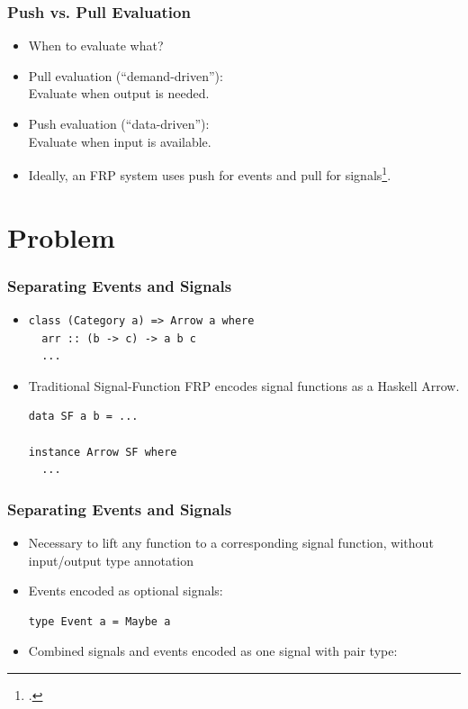 \documentclass{beamer}
\begin{document}
\begin{frame}
\frametitle{Push vs. Pull Evaluation}
    \begin{itemize}
        \item When to evaluate what?
        \item Pull evaluation (``demand-driven''):\\ Evaluate when output is needed.
        \item Push evaluation (``data-driven''):\\ Evaluate when input is available.
        \item Ideally, an FRP system uses push for events and pull for signals\footcite{Elliott2009}.
    \end{itemize}
\end{frame}

\section{Problem}

\begin{frame}[fragile]
\frametitle{Separating Events and Signals}
    \begin{itemize}
        \item[] 
\begin{Verbatim}
class (Category a) => Arrow a where
  arr :: (b -> c) -> a b c
  ...
\end{Verbatim}
        \item Traditional Signal-Function FRP encodes signal functions as a Haskell Arrow.
\begin{Verbatim}
data SF a b = ...

instance Arrow SF where
  ...
\end{Verbatim}
    \end{itemize}
\end{frame}

\begin{frame}[fragile]
\frametitle{Separating Events and Signals}
    \begin{itemize}
        \item Necessary to lift any function to a corresponding signal function, without input/output type annotation
        \item Events encoded as optional signals:
\begin{Verbatim}
type Event a = Maybe a
\end{Verbatim}
        \item Combined signals and events encoded as one signal with pair type:
    \end{itemize}
\end{frame}
\end{document}
